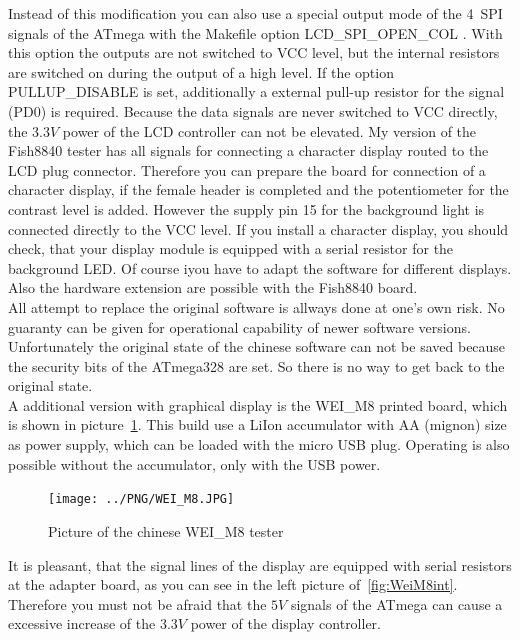 Instead of this modification you can also use a special output mode of the 4~SPI signals of the ATmega
with the Makefile option LCD\_SPI\_OPEN\_COL .
With this option the outputs are not switched to VCC level,
but the internal  resistors are switched on during the output of a high level.
If the option PULLUP\_DISABLE is set, additionally a external pull-up resistor for
the  signal (PD0) is required.
Because the data signals are never switched to VCC directly, the \(3.3V\) power of the LCD controller
can not be elevated.
My version of the Fish8840 tester has all signals for connecting a character display
routed to the LCD plug connector.
Therefore you can prepare the board for connection of a character display, if the
female header is completed and the potentiometer for the contrast level is added.
However the supply pin 15 for the background light is connected directly to the VCC level.
If you install a character display, you should check, that your display module
is equipped with a serial resistor for the background LED.
Of course iyou have to adapt the software for different displays. 
Also the hardware extension are possible with the Fish8840 board.\\

All attempt to replace the original software is allways done at one's own risk.
No guaranty can be given for operational capability of newer software versions.
Unfortunately the original state of the chinese software can not be saved because the 
security bits of the ATmega328 are set. So there is no way to get back to the original state.\\


A additional version with graphical display is the WEI\_M8 printed board, which is shown in picture~\ref{fig:WeiM8}.
This build use a LiIon accumulator with AA (mignon) size as power supply, which can be loaded
with the micro USB plug. Operating is also possible without the accumulator, only with the USB power.

\begin{figure}[H]
\centering
\texttt{[image: ../PNG/WEI\_M8.JPG]}
\caption{Picture of the chinese WEI\_M8 tester}
\label{fig:WeiM8}
\end{figure}

It is pleasant, that the signal lines of the display are equipped with serial resistors
at the adapter board, as you can see in the left picture of~\ref{fig:WeiM8int}.
Therefore you must not be afraid that the \(5V\) signals of the ATmega can cause a excessive
increase of the \(3.3V\) power of the display controller.

